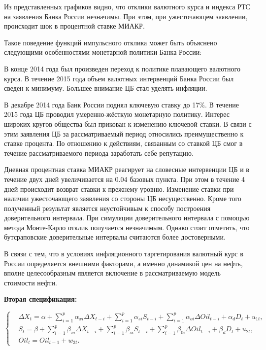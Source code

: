 \documentclass[14pt,a4paper, oneside]{extreport}
\newcounter{Notes1}
\newenvironment{Enumerate}%
{\begin{list}{\arabic{Notes1}.} {\usecounter{Notes1}%
\setlength{\labelsep}{0.5em}%
\setlength{\leftmargin}{1.25em}%
\setlength{\labelwidth}{1.25em}%
\setlength{\parsep}{0em}%
\setlength{\itemsep}{0em}%
\setlength{\topsep}{0.75ex}%
\setlength{\parskip}{0em}
}}%
{\end{list}}
\def \a{\alpha}
\def \b{\beta}
\def \Dt{\Delta}
\theoremstyle{plain}              %
\theoremstyle{definition}         %
\begin{document}
Из представленных графиков видно, что отклики валютного курса и индекса РТС на заявления Банка России незначимы. При этом, при ужесточающем заявлении, происходит шок в процентной ставке МИАКР. 

Такое поведение функций импульсного отклика может быть объяснено следующими особенностями монетарной политики Банка России:

\begin{Enumerate}

\item В конце 2014 года был произведен переход к политике плавающего валютного курса. В течение 2015 года объем валютных интервенций Банка России был сведен к минимуму. Большее внимание ЦБ стал уделять инфляции.

\item В декабре 2014 года Банк России поднял ключевую ставку до 17\%. В течение 2015 года ЦБ проводил умеренно-жёсткую монетарную политику. Интерес широких кругов общества был прикован к изменению ключевой ставки. В связи с этим заявления ЦБ за рассматриваемый период относились преимущественно к ставке процента. По отношению к действиям, связанным со ставкой ЦБ смог в течение рассматриваемого периода заработать себе репутацию.
\end{Enumerate} 

Дневная процентная ставка МИАКР реагирует на словесные интервенции ЦБ и в течение двух дней увеличивается на 0.04 базовых пункта. При этом в течение 4 дней происходит возврат ставки к прежнему уровню. Изменение ставки при наличии ужесточающего заявления со стороны ЦБ несущественно. Кроме того полученный результат является неустойчивым к способу построения доверительного интервала. При симуляции доверительного интервала с помощью метода Монте-Карло отклик получается незначимым. Однако стоит отметить, что бутсраповские доверительные интервалы считаются более достоверными.

В связи с тем, что в условиях инфляционного таргетирования валютный курс в России определяется внешними факторами, а именно динамикой цен на нефть, вполне целесообразным является включение в рассматриваемую модель стоимости нефти. 

\textbf{Вторая спецификация:}

\begin{equation}\label{f} 
\left\{
\begin{aligned}
&\Dt X_t = \a + \sum_{i=1}^p \a_{xi} \Dt X_{t-i} + \sum_{i=1}^p \a_{si} S_{t-i} + \sum_{i=1}^p \a_{oi} \Dt Oil_{t-i}+\a_d D_t +  u_{1t}, \\
&S_t = \b + \sum_{i=1}^p \b_{xi} \Dt X_{t-i} + \sum_{i=1}^p \b_{si} S_{t-i} + \sum_{i=1}^p \b_{0i} \Dt Oil_{t-i} + \b_d D_t +  u_{2t}, \\
&Oil_t =  Oil_{t-1} +  w_{3t}.
\end{aligned}
\right.
\end{equation}
\end{document}
